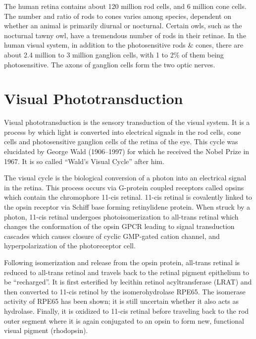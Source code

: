 The human retina contains about 120 million rod cells, and 6 million cone cells. The number and ratio of rods to cones varies among species, dependent on whether an animal is primarily diurnal or nocturnal. Certain owls, such as the nocturnal tawny owl, have a tremendous number of rods in their retinae. In the human visual system, in addition to the photosensitive rods \& cones, there are about 2.4 million to 3 million ganglion cells, with 1 to 2\% of them being photosensitive. The axons of ganglion cells form the two optic nerves.

\hypertarget{visual-phototransduction}{%
\section{Visual Phototransduction}\label{visual-phototransduction}}

Visual phototransduction is the sensory transduction of the visual system. It is a process by which light is converted into electrical signals in the rod cells, cone cells and photosensitive ganglion cells of the retina of the eye. This cycle was elucidated by George Wald (1906--1997) for which he received the Nobel Prize in 1967. It is so called ``Wald's Visual Cycle'' after him.

The visual cycle is the biological conversion of a photon into an electrical signal in the retina. This process occurs via G-protein coupled receptors called opsins which contain the chromophore 11-cis retinal. 11-cis retinal is covalently linked to the opsin receptor via Schiff base forming retinylidene protein. When struck by a photon, 11-cis retinal undergoes photoisomerization to all-trans retinal which changes the conformation of the opsin GPCR leading to signal transduction cascades which causes closure of cyclic GMP-gated cation channel, and hyperpolarization of the photoreceptor cell.

Following isomerization and release from the opsin protein, all-trans retinal is reduced to all-trans retinol and travels back to the retinal pigment epithelium to be ``recharged''. It is first esterified by lecithin retinol acyltransferase (LRAT) and then converted to 11-cis retinol by the isomerohydrolase RPE65. The isomerase activity of RPE65 has been shown; it is still uncertain whether it also acts as hydrolase. Finally, it is oxidized to 11-cis retinal before traveling back to the rod outer segment where it is again conjugated to an opsin to form new, functional visual pigment (rhodopsin).

